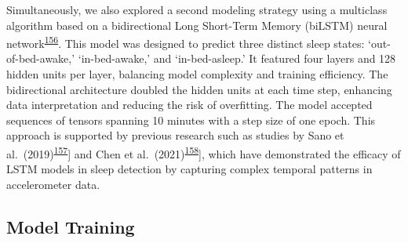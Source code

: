 \documentclass[
  10pt,
]{scrbook}
\begin{document}
Simultaneously, we also explored a second modeling strategy using a
multiclass algorithm based on a bidirectional Long Short-Term Memory
(biLSTM) neural
network\textsuperscript{\protect\hyperlink{ref-hochreiter_long_1997}{156}}.
This model was designed to predict three distinct sleep states:
`out-of-bed-awake,' `in-bed-awake,' and `in-bed-asleep.' It featured
four layers and 128 hidden units per layer, balancing model complexity
and training efficiency. The bidirectional architecture doubled the
hidden units at each time step, enhancing data interpretation and
reducing the risk of overfitting. The model accepted sequences of
tensors spanning 10 minutes with a step size of one epoch. This approach
is supported by previous research such as studies by Sano et
al.~(2019)\textsuperscript{\protect\hyperlink{ref-sano_multimodal_2019}{157}}{]}
and Chen et
al.~(2021)\textsuperscript{\protect\hyperlink{ref-chen_attention_2021}{158}}{]},
which have demonstrated the efficacy of LSTM models in sleep detection
by capturing complex temporal patterns in accelerometer data.

\hypertarget{model-training}{%
\subsection{Model Training}\label{model-training}}
\end{document}
